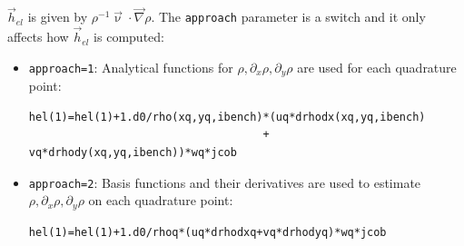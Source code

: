 $\vec{h}_{el}$ is given by $\rho^{-1} \vec\upnu \cdot \vec\nabla \rho$.
The {\tt approach} parameter is a switch and it only affects how $\vec{h}_{el}$ is computed:
\begin{itemize}
\item {\tt approach=1}:
Analytical functions for $\rho,\partial_x\rho,\partial_y\rho$ are used for each quadrature point:
\begin{verbatim}
hel(1)=hel(1)+1.d0/rho(xq,yq,ibench)*(uq*drhodx(xq,yq,ibench) 
                                    + vq*drhody(xq,yq,ibench))*wq*jcob
\end{verbatim}
\item {\tt approach=2}:
Basis functions and their derivatives are used to estimate $\rho,\partial_x\rho,\partial_y\rho$ on each quadrature point:
\begin{verbatim}
hel(1)=hel(1)+1.d0/rhoq*(uq*drhodxq+vq*drhodyq)*wq*jcob 
\end{verbatim}
\end{itemize}








